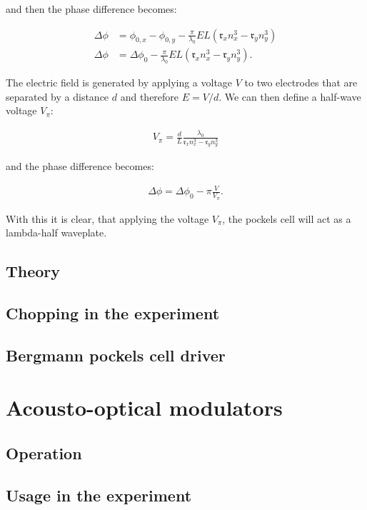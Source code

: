 and then the phase difference becomes:

\begin{align}
	\Delta \phi & = \phi_{0,x} - \phi_{0,y} - \frac{\pi}{\lambda_0} E L \left(\mathfrak{r}_x n_x^3 - \mathfrak{r}_y n_y^3\right) \\
	\Delta \phi & = \Delta \phi_{0} - \frac{\pi}{\lambda_0} E L \left(\mathfrak{r}_x n_x^3 - \mathfrak{r}_y n_y^3\right) .
\end{align}

The electric field is generated by applying a voltage $V$ to two electrodes that are separated by a distance $d$ and therefore $E = V/d$. We can then define a half-wave voltage $V_\pi$:

\begin{align}
	V_\pi = \frac{d}{L} \frac{\lambda_0}{\mathfrak{r}_x n_x^3 - \mathfrak{r}_y n_y^3}
\end{align}

and the phase difference becomes:

\begin{align}
	\Delta \phi = \Delta \phi_0 - \pi \frac{V}{V_\pi} .
\end{align}

With this it is clear, that applying the voltage $V_\pi$, the pockels cell will act as a lambda-half waveplate.

\begin{figure}[h]
\end{figure}

\subsection{Theory}
	\subsection{Chopping in the experiment}
	\subsection{Bergmann pockels cell driver}

\section{Acousto-optical modulators}
	\subsection{Operation}
	\subsection{Usage in the experiment}

